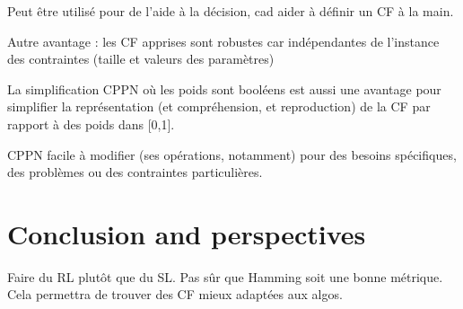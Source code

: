 \documentclass{article}
\begin{document}
Peut être utilisé pour de l'aide à la décision, cad aider à définir un
CF à la main.

Autre avantage  : les CF  apprises sont robustes car  indépendantes de
l'instance des contraintes (taille et valeurs des paramètres)

La  simplification CPPN  où  les  poids sont  booléens  est aussi  une
avantage  pour  simplifier  la représentation  (et  compréhension,  et
reproduction) de la CF par rapport à des poids dans [0,1].

CPPN facile  à modifier (ses  opérations, notamment) pour  des besoins
spécifiques, des problèmes ou des contraintes particulières.


\section{Conclusion and perspectives}\label{sec:conclusion}

Faire du  RL plutôt  que du  SL. Pas  sûr que  Hamming soit  une bonne
métrique. Cela permettra de trouver des CF mieux adaptées aux algos.




\end{document}
